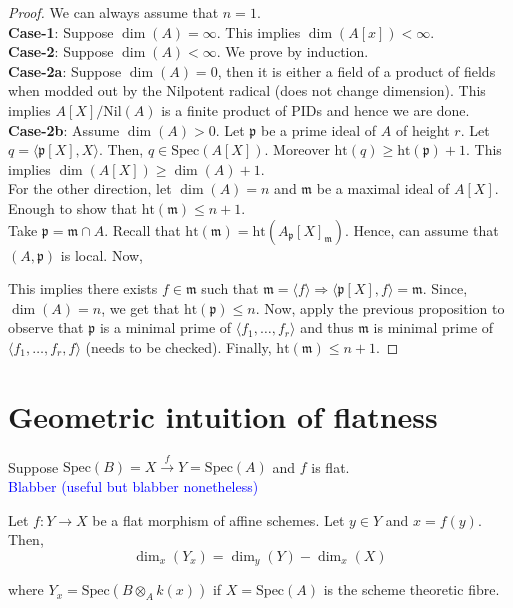 \documentclass[oneside, 12pt]{scrbook}
\newcommand{\spec}{\mathrm{Spec}}
\newcommand{\pr}{\mathfrak{p}}
\newcommand{\m}{\mathfrak{m}}
\newcommand{\nil}{\mathrm{Nil}}
\newcommand{\Ht}{\mathrm{ht}}
\theoremstyle{theorem}
\begin{document}
\begin{proof}
We can always assume that $n=1$. \\


\textbf{Case-1}: Suppose $\dim (A) = \infty $. This implies $\dim (A[x])< \infty $. \\

\textbf{Case-2}: Suppose $\dim (A) < \infty $. We prove by induction. \\

\textbf{Case-2a}: Suppose $\dim (A)=0$, then it is either a field of a product of fields when modded out by the Nilpotent radical (does not change dimension). This implies $A[X]/ \nil(A)$ is a finite product of PIDs and hence we are done.\\

\textbf{Case-2b}: Assume $\dim (A) > 0$. Let $\pr$ be a prime ideal of $A$ of height $r$. Let $	q = \langle \pr[X], X \rangle $. Then, $q \in \spec(A[X])$. Moreover $\Ht(q) \geq \Ht(\pr) + 1$. This implies $\dim(A[X]) \geq \dim (A) + 1$. \\

For the other direction, let $\dim (A)=n$ and $\m$ be a maximal ideal of $A[X]$. Enough to show that $\Ht(\m) \le n+ 1$. \\
Take $\pr = \m \cap A$. Recall that $\Ht(\m) = \Ht(A_{\pr}[X]_{\m})$. Hence, can assume that $(A, \pr) $ is local. Now, 



This implies there exists $f\in \m$ such that $\m = \langle f \rangle \Rightarrow \langle \pr[X],f \rangle = \m$. Since, $\dim (A) = n$, we get that $\Ht(\pr) \le n$. Now, apply the previous proposition to observe that $\pr$ is a minimal prime of $\langle f_{1}, \hdots , f_{r} \rangle$ and thus $\m$ is minimal prime of $\langle f_{1}, \hdots , f_{r}, f\rangle$ (needs to be checked). Finally, $\Ht(\m) \le n+1$.
\end{proof}

\section{Geometric intuition of flatness}

Suppose $\spec(B) = X \xrightarrow{f} Y = \spec(A)$ and $f$ is flat. \\

\textcolor{Blue}{Blabber (useful but blabber nonetheless)}

\begin{theorem}
Let $f: Y \rightarrow X$ be a flat morphism of affine schemes. Let $y \in Y$ and $x = f(y)$. Then,   
\begin{equation}
\dim_{x}(Y_{x}) = \dim_{y}(Y) - \dim_{x}(X)
\end{equation}

where $Y_{x} = \spec(B \otimes_{A} k(x))$ if $X=\spec(A)$ is the scheme theoretic fibre.
\end{theorem}
\end{document}
